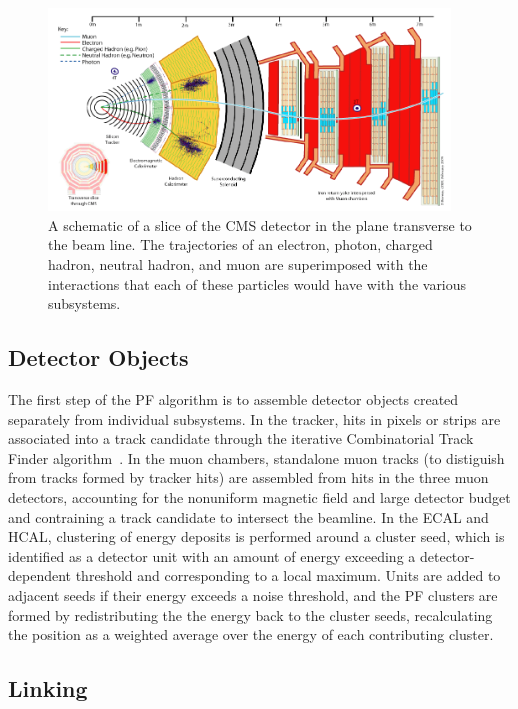 \begin{figure}[ht]
 \begin{center}
    \includegraphics[width=0.95\textwidth]{figures/objects/pf.pdf}
      \end{center}
\caption{A schematic of a slice of the CMS detector in the plane transverse to the beam line.
The trajectories of an electron, photon, charged hadron, neutral hadron, and muon are superimposed
with the interactions that each of these particles would have with the various subsystems.}
\label{fig:PF}
\end{figure}

\subsection{Detector Objects\label{subsec:detobj}}

The first step of the PF algorithm is to assemble detector objects created separately from
individual subsystems. In the tracker, hits in pixels or strips are associated into a track candidate
through the iterative Combinatorial Track Finder algorithm~\cite{PFPAS2009}. In the muon chambers,
standalone muon tracks (to distiguish from tracks formed by tracker hits)
are assembled from hits in the three muon detectors, accounting
for the nonuniform magnetic field and large detector budget and contraining a track candidate to
intersect the beamline. In the ECAL and HCAL, clustering of energy deposits is performed around a
cluster seed, which is identified as a detector unit with an amount of energy exceeding a
detector-dependent threshold and corresponding to a local maximum.
Units are added to adjacent seeds if their energy exceeds a noise threshold, and the PF clusters are
formed by redistributing the the energy back to the cluster seeds, recalculating the position as a
weighted average over the energy of each contributing cluster.

\subsection{Linking\label{subsec:linking}}


